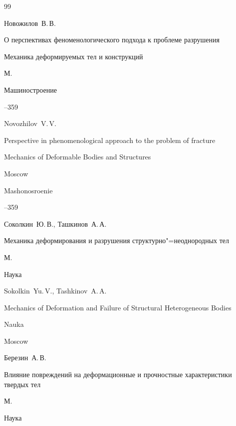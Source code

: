 \begin{thebibliography}{99}

\by Новожилов~В.\,В.

\paper О перспективах феноменологического подхода к проблеме разрушения

\inbook Механика деформируемых тел и конструкций

\publaddr М.

\publ Машиностроение


--359

\by Novozhilov~V.\,V.

\paper Perspective in phenomenological approach to the problem of fracture 

\inbook Mechanics of Deformable Bodies and Structures


\publaddr Moscow

\publ Mashonosroenie

--359






\by Соколкин~Ю.\,В., Ташкинов~А.\,А.

\book Механика деформирования и разрушения структурно"=неоднородных тел

\publaddr М.

\publ Наука



\misctransl

\by Sokolkin~Yu.\,V.,  Tashkinov~A.\,A.

\book Mechanics of Deformation and Failure of Structural Heterogeneous Bodies 

\publ Nauka

\publaddr Moscow 






\by Березин~А.\,В.

\book Влияние повреждений на деформационные и прочностные характеристики твердых тел

\publaddr М.

\publ Наука




\end{thebibliography}
